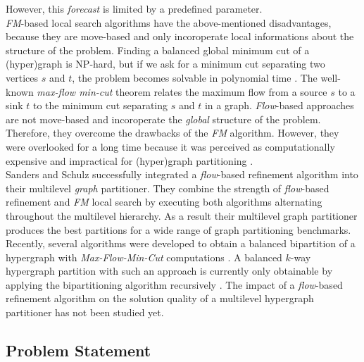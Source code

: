 However, this \emph{forecast} is limited by a predefined parameter. \\
\emph{FM}-based local search algorithms have the above-mentioned disadvantages, because
they are move-based and only incoroperate local informations about the structure of the problem.
Finding a balanced global minimum cut of a (hyper)graph is NP-hard, but if we ask for a minimum
cut separating two vertices $s$ and $t$, the problem becomes solvable in polynomial time \cite{edmonds1972theoretical}.
The well-known \emph{max-flow min-cut} theorem \cite{ford1956maximal} relates the
maximum flow from a source $s$ to a sink $t$ to the minimum cut separating
$s$ and $t$ in a graph. \emph{Flow}-based approaches are not move-based and
incoroperate the \emph{global} structure of the problem.
Therefore, they overcome the drawbacks of the \emph{FM} algorithm. However, they were overlooked for a long time because
it was perceived as computationally expensive and impractical for (hyper)graph partitioning
\cite{liu1998network}. \\ 
Sanders and Schulz \cite{sanders2011engineering} successfully integrated a \emph{flow}-based refinement
algorithm into their multilevel \emph{graph} partitioner. 
They combine the strength of \emph{flow}-based refinement and \emph{FM}
local search by executing both algorithms alternating throughout the multilevel hierarchy.
As a result their multilevel graph partitioner produces the best partitions for 
a wide range of graph partitioning benchmarks. 
Recently, several algorithms were developed to obtain a balanced bipartition of a hypergraph 
with \emph{Max-Flow-Min-Cut} computations \cite{liu1998network,patkar2004efficient,yang1996balanced}. 
A balanced $k$-way hypergraph partition with such an approach is currently only
obtainable by applying the bipartitioning algorithm recursively \cite{yang1996balanced}. 
The impact of a \emph{flow}-based refinement algorithm on the solution quality of 
a multilevel hypergraph partitioner has not been studied yet. 

\subsection{Problem Statement}


